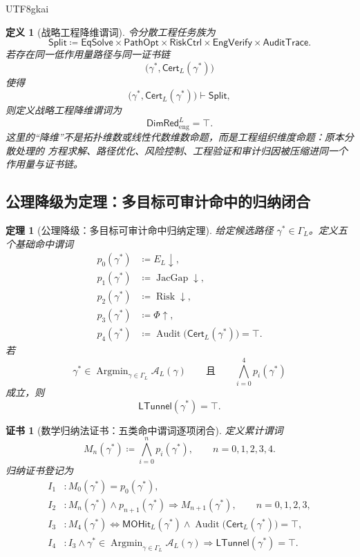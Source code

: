 \documentclass[12pt]{article}
\newtheorem{definition}{定义}[section]
\newtheorem{theorem}{定理}[section]
\newtheorem{Certificate}{证书}[section]
\newcommand{\DefEq}{\coloneqq}
\DeclareMathOperator{\Audit}{Audit}
\DeclareMathOperator{\JacGap}{JacGap}
\DeclareMathOperator{\Risk}{Risk}
\DeclareMathOperator*{\Argmin}{Argmin}
\begin{document}
\begin{CJK*}{UTF8}{gkai}
\begin{definition}[战略工程降维谓词]
\label{def:tex58-strategic-dimred-predicate}
令分散工程任务族为
\[
  \mathsf{Split}
  \DefEq
  \mathsf{EqSolve}
  \times
  \mathsf{PathOpt}
  \times
  \mathsf{RiskCtrl}
  \times
  \mathsf{EngVerify}
  \times
  \mathsf{AuditTrace}.
\]
若存在同一低作用量路径与同一证书链
\[
  \bigl(\gamma^\ast,\mathsf{Cert}_L(\gamma^\ast)\bigr)
\]
使得
\[
  \bigl(\gamma^\ast,\mathsf{Cert}_L(\gamma^\ast)\bigr)
  \vdash
  \mathsf{Split},
\]
则定义战略工程降维谓词为
\[
  \mathsf{DimRed}_{\mathrm{eng}}^L=\top.
\]
这里的“降维”不是拓扑维数或线性代数维数命题，而是工程组织维度命题：原本分散处理的
方程求解、路径优化、风险控制、工程验证和审计归因被压缩进同一个作用量与证书链。
\end{definition}

\subsection[公理降级：多目标审计命中归纳]{公理降级为定理：多目标可审计命中的归纳闭合}
\label{subsec:tex58-multiobjective-audit-induction}

\begin{theorem}[公理降级：多目标可审计命中归纳定理]
\label{thm:tex58-multiobjective-audit-induction}
给定候选路径 \(\gamma^\ast\in\Gamma_L\)。定义五个基础命中谓词
\[
\begin{aligned}
  p_0(\gamma^\ast)&\DefEq E_L\downarrow,\\
  p_1(\gamma^\ast)&\DefEq \JacGap\downarrow,\\
  p_2(\gamma^\ast)&\DefEq \Risk\downarrow,\\
  p_3(\gamma^\ast)&\DefEq \Phi\uparrow,\\
  p_4(\gamma^\ast)&\DefEq \Audit\bigl(\mathsf{Cert}_L(\gamma^\ast)\bigr)=\top.
\end{aligned}
\]
若
\[
  \gamma^\ast\in\Argmin_{\gamma\in\Gamma_L}\mathcal A_L(\gamma)
  \qquad\text{且}\qquad
  \bigwedge_{i=0}^{4}p_i(\gamma^\ast)
\]
成立，则
\[
  \mathsf{LTunnel}(\gamma^\ast)=\top.
\]
\end{theorem}

\begin{Certificate}[数学归纳法证书：五类命中谓词逐项闭合]
\label{cert:tex58-multiobjective-audit-induction}
定义累计谓词
\[
  M_n(\gamma^\ast)
  \DefEq
  \bigwedge_{i=0}^{n}p_i(\gamma^\ast),
  \qquad n=0,1,2,3,4.
\]
归纳证书登记为
\[
\begin{aligned}
  I_1 &: M_0(\gamma^\ast)=p_0(\gamma^\ast),\\
  I_2 &: M_n(\gamma^\ast)\wedge p_{n+1}(\gamma^\ast)
         \Rightarrow M_{n+1}(\gamma^\ast),
         \qquad n=0,1,2,3,\\
  I_3 &: M_4(\gamma^\ast)
         \Longleftrightarrow
         \mathsf{MOHit}_L(\gamma^\ast)
         \wedge
         \Audit\bigl(\mathsf{Cert}_L(\gamma^\ast)\bigr)=\top,\\
  I_4 &: I_3\wedge
         \gamma^\ast\in\Argmin_{\gamma\in\Gamma_L}\mathcal A_L(\gamma)
         \Rightarrow
         \mathsf{LTunnel}(\gamma^\ast)=\top.
\end{aligned}
\]
\end{Certificate}


\end{CJK*}
\end{document}
